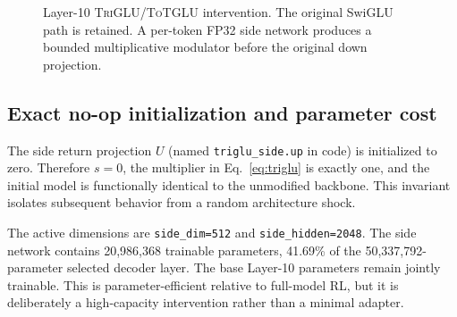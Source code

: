 \documentclass[10pt]{article}
\newcommand{\TriGLU}{\textsc{TriGLU}}
\newcommand{\ToTGLU}{\textsc{ToTGLU}}
\begin{document}
\begin{figure}[H]
\centering
{}
\caption{Layer-10 \TriGLU{}/\ToTGLU{} intervention.  The original SwiGLU path
is retained.  A per-token FP32 side network produces a bounded multiplicative
modulator before the original down projection.}
\label{fig:architecture}
\end{figure}

\subsection{Exact no-op initialization and parameter cost}

The side return projection $U$ (named \texttt{triglu\_side.up} in code) is
initialized to zero.  Therefore $s=0$, the multiplier in
Eq.~\ref{eq:triglu} is exactly one, and the initial model is functionally
identical to the unmodified backbone.  This invariant isolates subsequent
behavior from a random architecture shock.

The active dimensions are \texttt{side\_dim=512} and
\texttt{side\_hidden=2048}.  The side network contains 20,986,368 trainable
parameters, 41.69\% of the 50,337,792-parameter selected decoder layer.  The
base Layer-10 parameters remain jointly trainable.  This is parameter-efficient
relative to full-model RL, but it is deliberately a high-capacity intervention
rather than a minimal adapter.
\end{document}
